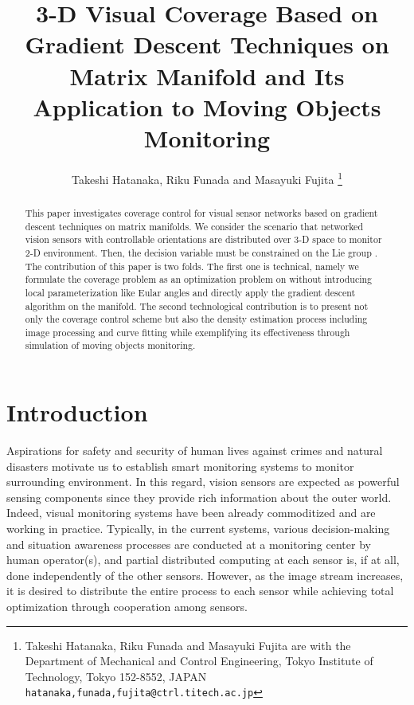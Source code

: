 \documentclass[conference,letterpaper]{ieeeconf}
\title{3-D Visual Coverage Based on
Gradient Descent Techniques on Matrix Manifold
and Its Application to Moving Objects Monitoring}
\author{Takeshi Hatanaka, Riku Funada and Masayuki Fujita
\thanks{Takeshi Hatanaka, Riku Funada and Masayuki Fujita are with the Department of Mechanical and 
Control Engineering, Tokyo Institute of Technology, Tokyo 152-8552, JAPAN
        {\tt\small {hatanaka,funada,fujita}@ctrl.titech.ac.jp}}}
\begin{document}
\maketitle
\thispagestyle{empty}
\pagestyle{empty}

\begin{abstract}
This paper investigates coverage control 
for visual sensor networks based on gradient descent
techniques on matrix manifolds.
We consider the scenario 
that networked vision sensors with controllable orientations
are distributed over 3-D space to 
monitor 2-D environment.
Then, the decision variable must be constrained
on the Lie group .
The contribution of this paper is two folds.
The first one is technical, namely we formulate the coverage problem as an optimization
problem on  without introducing local parameterization like
Eular angles and directly apply the gradient descent algorithm on 
the manifold.
The second technological contribution is to 
present not only the coverage control scheme but
also the density estimation process including image processing
and curve fitting while exemplifying its effectiveness 
through simulation of moving objects monitoring.
\end{abstract}




\section{Introduction}



Aspirations for safety and security of human lives against 
crimes and natural disasters 
motivate us to establish smart monitoring systems 
to monitor surrounding environment.
In this regard, vision sensors are expected as powerful 
sensing components since they
provide rich information about the outer world. 
Indeed, visual monitoring systems have been already
commoditized and are working in practice.
Typically, in the current systems, 
various decision-making and situation awareness processes 
are conducted at a monitoring center by human operator(s),
and partial distributed computing at each sensor is, if at all, done 
independently of the other sensors.
However, as the image stream increases, 
it is desired to distribute the entire process
to each sensor while achieving total optimization
through cooperation among sensors.
\end{document}

